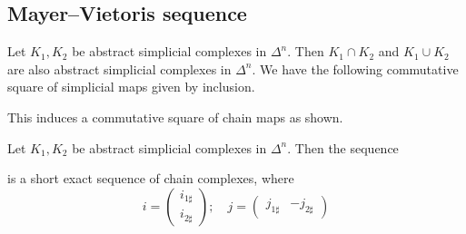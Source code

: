 \subsection{Mayer--Vietoris sequence}
Let \( K_1, K_2 \) be abstract simplicial complexes in \( \Delta^n \).
Then \( K_1 \cap K_2 \) and \( K_1 \cup K_2 \) are also abstract simplicial complexes in \( \Delta^n \).
We have the following commutative square of simplicial maps given by inclusion.
\begin{center}
\end{center}
This induces a commutative square of chain maps as shown.
\begin{center}
\end{center}
\begin{proposition}
	Let \( K_1, K_2 \) be abstract simplicial complexes in \( \Delta^n \).
	Then the sequence
	\begin{center}
	\end{center}
	is a short exact sequence of chain complexes, where
	\[ i = \begin{pmatrix}i_{1\sharp}\\i_{2\sharp}\end{pmatrix};\quad j = \begin{pmatrix}j_{1\sharp}&-j_{2\sharp}\end{pmatrix} \]
\end{proposition}
